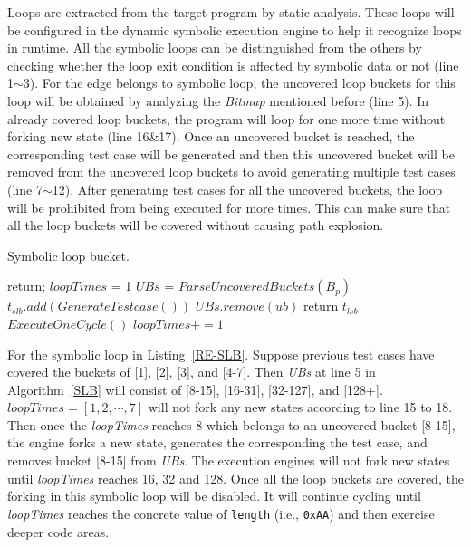 \documentclass{cta-author}
\begin{document}
Loops are extracted from the target program by static analysis. 
These loops will be configured in the dynamic symbolic execution 
engine to help it recognize loops in runtime. All the symbolic loops 
can be distinguished from the others by checking whether the loop 
exit condition is affected by symbolic data or not (line 1$\sim$3). 
For the edge belongs to symbolic loop, the uncovered loop buckets 
for this loop will be obtained by analyzing the \textit{Bitmap} 
mentioned before (line 5). 
In already covered loop buckets, the program will loop for one more 
time without forking new state (line 16\&17). Once an uncovered bucket 
is reached, the corresponding test case will be generated and then 
this uncovered bucket will be removed from the uncovered loop buckets 
to avoid generating multiple test cases (line 7$\sim$12). After 
generating test cases for all the uncovered buckets, the loop will 
be prohibited from being executed for more times. This can make sure 
that all the loop buckets will be covered without causing path explosion.

\begin{algorithm}
	\LinesNumbered
	\caption{Symbolic loop bucket.}
	\label{SLB}
	{
		return;
	}
	$loopTimes$ = 1\;
	$UBs$ = $ParseUncoveredBuckets(B_p)$\;
	{
		{
			{
				$t_{slb}.add(GenerateTestcase())$\;
				$UBs$.$remove(ub)$\;
			}
		}
		{
			return $t_{lsb}$\;
		}{
		$ExecuteOneCycle()$\;
		$loopTimes += 1$\;
	}
}
\end{algorithm}  

For the symbolic loop in Listing~\ref{RE-SLB}. Suppose previous 
test cases have covered the buckets of [1], [2], [3], and [4-7]. 
Then \textit{UBs} at line 5 in Algorithm~\ref{SLB} will consist of 
[8-15], [16-31], [32-127], and [128+]. 
$\textit{loopTimes}=[1, 2, \cdots, 7]$ will not fork any new states 
according to line 15 to 18. Then once the \textit{loopTimes} reaches 
8 which belongs to an uncovered bucket [8-15], the engine forks a 
new state,  generates the corresponding the test case, and removes 
bucket [8-15] from \textit{UBs}. The execution engines will not 
fork new states until \textit{loopTimes} reaches 16, 32 and 128. 
Once all the loop buckets are covered, the forking in this 
symbolic loop will be disabled. It will continue cycling until 
\textit{loopTimes} reaches the concrete value of \texttt{length} 
(i.e., \texttt{0xAA}) and then exercise deeper code areas.
\end{document}
